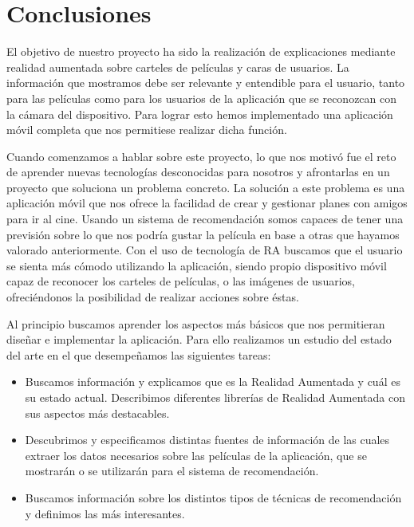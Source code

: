 
\cleardoublepage


\chapter{Conclusiones}
\label{makereference5}

El objetivo de nuestro proyecto ha sido la realización de explicaciones mediante realidad aumentada sobre 
carteles de películas y caras de usuarios. La información que mostramos debe ser relevante y entendible para el 
usuario, tanto para las películas como para los usuarios de la aplicación que se reconozcan con la cámara del dispositivo. 
Para lograr esto hemos implementado una aplicación móvil completa que nos permitiese realizar dicha función.

Cuando comenzamos a hablar sobre este proyecto, lo que nos motivó fue el
 reto de aprender nuevas tecnologías desconocidas para nosotros y afrontarlas
 en un proyecto que soluciona un problema concreto. La solución a este problema
 es una aplicación móvil que nos ofrece la facilidad de crear y gestionar
 planes con amigos para ir al cine. Usando un sistema de recomendación somos
 capaces de tener una previsión sobre lo que nos podría gustar la película en
 base a otras que hayamos valorado anteriormente.
 Con el uso de tecnología de RA buscamos que el usuario se sienta más cómodo
 utilizando la aplicación, siendo 
 propio dispositivo móvil capaz de reconocer los carteles de películas, o las
 imágenes de usuarios, ofreciéndonos la posibilidad de realizar acciones sobre éstas.

Al principio buscamos aprender los aspectos más básicos que nos permitieran
 diseñar e implementar la aplicación. Para ello realizamos un estudio
 del estado del arte en el que desempeñamos las siguientes tareas:
\begin{itemize}  
    \item Buscamos información y explicamos que es la Realidad Aumentada y cuál
     es su estado actual. Describimos diferentes librerías de Realidad Aumentada
     con sus aspectos más destacables.
    \item Descubrimos y especificamos distintas fuentes de información de las
     cuales extraer los datos necesarios sobre las películas de la aplicación,
     que se mostrarán o se utilizarán para el sistema de recomendación.
    \item Buscamos información sobre los distintos tipos de técnicas de
     recomendación y definimos las más interesantes.
\end{itemize}

